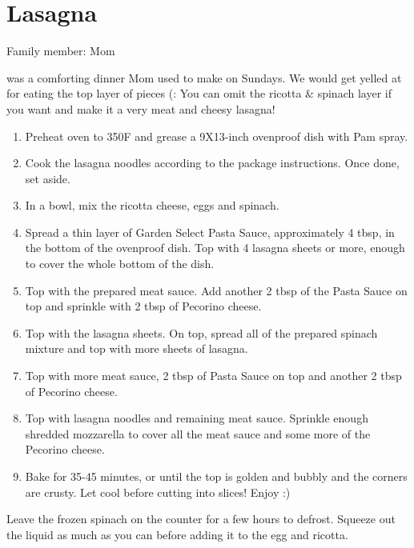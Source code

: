 \chapter{Lasagna}
\label{ch:lasagna}


Family member: Mom

 was a comforting dinner Mom used to make on Sundays. We would get yelled at for eating the top layer of pieces (: You can omit the ricotta \& spinach layer if you want and make it a very meat and cheesy lasagna!

\begin{enumerate}
    \item Preheat oven to 350\degree F and grease a 9X13-inch ovenproof dish with Pam spray.
    \item Cook the lasagna noodles according to the package instructions. Once done, set aside.
    \item In a bowl, mix the ricotta cheese, eggs and spinach.
    \item Spread a thin layer of Garden Select Pasta Sauce, approximately 4 tbsp, in the bottom of the ovenproof dish. Top with 4 lasagna sheets or more, enough to cover the whole bottom of the dish.
    \item Top with the prepared meat sauce. Add another 2 tbsp of the Pasta Sauce on top and sprinkle with 2 tbsp of Pecorino cheese.
    \item Top with the lasagna sheets. On top, spread all of the prepared spinach mixture and top with more sheets of lasagna.
    \item Top with more meat sauce, 2 tbsp of Pasta Sauce on top and another 2 tbsp of Pecorino cheese.
    \item Top with lasagna noodles and remaining meat sauce. Sprinkle enough shredded mozzarella to cover all the meat sauce and some more of the Pecorino cheese.
    \item Bake for 35-45 minutes, or until the top is golden and bubbly and the corners are crusty. Let cool before cutting into slices! Enjoy :)
\end{enumerate}

Leave the frozen spinach on the counter for a few hours to defrost. Squeeze out the liquid as much as you can before adding it to the egg and ricotta.

